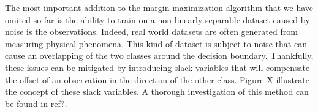 The most important addition to the margin maximization algorithm that we have omited so far is the ability to train on a non linearly separable dataset caused by noise is the observations. Indeed, real world datasets are often generated from measuring physical phenomena. This kind of dataset is subject to noise that can cause an overlapping of the two classes around the decision boundary. Thankfully, these issues can be mitigated by introducing slack variables that will compensate the offset of an observation in the direction of the other class. Figure X illustrate the concept of these slack variables. A thorough investigation of this method can be found in  \textcolor[rgb]{1,0,0}{ref?}.

